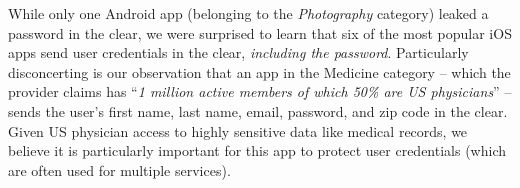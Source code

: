 While only one Android app (belonging to the \emph{Photography} category) leaked a password in the clear, 
we were surprised to learn that six of the most popular iOS apps send user 
credentials in the clear, \emph{including the password}. Particularly disconcerting 
is our observation that an app in the Medicine category -- which the provider claims has ``\emph{1 million active members 
of which 50\% are US physicians}'' -- sends the user's first name, last name, 
email, password, and zip code in the clear. Given US physician access to highly sensitive 
data like medical records, we believe it is particularly important for this app to protect 
user credentials (which are often used for multiple services). 


